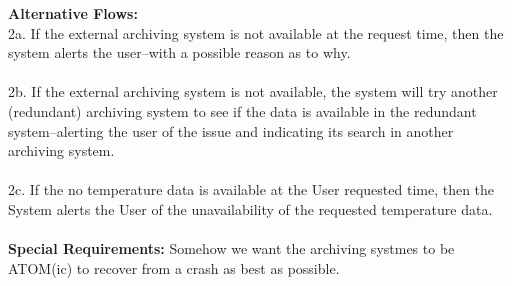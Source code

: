 \documentclass[letterpaper]{article}
\begin{document}
\textbf{Alternative Flows:  }\\
2a.  If the external archiving system is not available at the request
time, then the system alerts the user--with a possible reason as to
why.\\\\
2b.  If the external archiving system is not available, the system
will try another (redundant) archiving system to see if the data is
available in the redundant system--alerting the user of the issue and
indicating its search in another archiving system.\\\\
2c.  If the no temperature data is available at the User requested
time, then the System alerts the User of the unavailability of the
requested temperature data.\\\\
\textbf{Special Requirements:  }Somehow we want the archiving systmes
to be ATOM(ic) to recover from a crash as best as possible.\\\\
\end{document}
